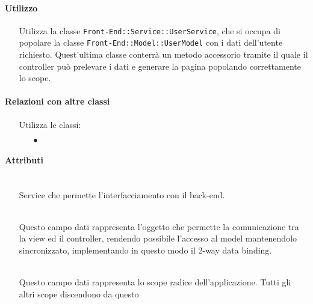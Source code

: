 \paragraph*{Utilizzo}
\begin{itemize}
\item[] Utilizza la classe \texttt{Front-End::Service::UserService}, che si occupa di popolare la classe \texttt{Front-End::Model::UserModel} con i dati dell'utente richiesto. Quest'ultima classe conterrà un metodo accessorio tramite il quale il controller può prelevare i dati e generare la pagina popolando correttamente lo scope.
\end{itemize}

\paragraph*{Relazioni con altre classi}
\begin{itemize}


\item[] Utilizza le classi:
\begin{itemize}
\item[$\bullet$] 
\end{itemize}
\end{itemize}

\paragraph*{Attributi}
\begin{itemize}
\item[]  \\ Service che permette l'interfacciamento con il back-end.
\item[]  \\ Questo campo dati rappresenta l'oggetto che permette la comunicazione tra la view ed il controller, rendendo possibile l’accesso al model mantenendolo sincronizzato, implementando in questo modo il 2-way data binding.
\item[]  \\ Questo campo dati rappresenta lo scope radice dell'applicazione. Tutti gli altri scope discendono da questo
\end{itemize}

